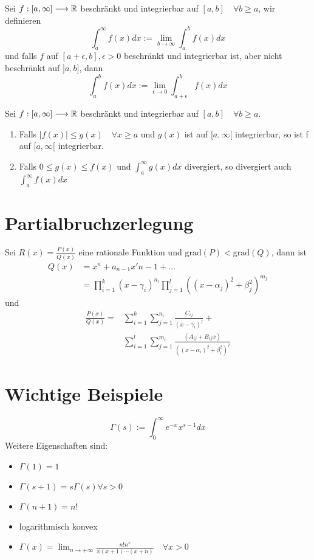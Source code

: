 \Def Sei $f:[a,\infty] \longrightarrow \mathbb{R}$ beschränkt und integrierbar auf $[a,b] \quad \forall b \geq a$, wir definieren
$$\int_a^\infty f(x) dx := \lim_{b \rightarrow \infty} \int_a^b f(x) dx$$
und falls $f$ auf $[a+\epsilon,b], \epsilon>0$ beschränkt und integrierbar ist, aber nicht beschränkt auf $]a,b]$, dann
$$\int_a^b f(x) dx := \lim_{\epsilon \rightarrow 0} \int_{a+\epsilon}^b f(x) dx$$

\Lemma Sei $f:[a,\infty] \longrightarrow \mathbb{R}$ beschränkt und integrierbar auf $[a,b] \quad \forall b \geq a$.
\begin{enumerate}
  \item Falls $|f(x)| \leqslant g(x) \quad \forall x \geqslant a$ und $g(x)$ ist auf $[a, \infty[$ integrierbar, so ist f auf $[a, \infty[$ integrierbar.
  \item Falls $0 \leqslant g(x) \leqslant f(x)$ und $\int_a^\infty g(x) dx$ divergiert, so divergiert auch $\int_a^\infty f(x) dx$
\end{enumerate}

\section{Partialbruchzerlegung}
\Trick Sei $R(x) = \frac{P(x)}{Q(x)}$ eine rationale Funktion und $\text{grad}(P) < \text{grad}(Q)$, dann ist
\begin{align*}
Q(x) &= x^n + a_{n-1}x'{n-1}+\dots \\
	 &=	\prod_{i=1}^{k}\left(x-\gamma_{i}\right)^{n_{i}} \prod_{j=1}^{l}\left(\left(x-\alpha_{j}\right)^{2}+\beta_{j}^{2}\right)^{m_{j}} 
\end{align*}
und
\begin{align*}
\frac{P(x)}{Q(x)}=&\sum_{i=1}^{k} \sum_{j=1}^{n_{i}} \frac{C_{i j}}{\left(x-\gamma_{i}\right)^{j}}+ \\
				 &\sum_{i=1}^{l} \sum_{j=1}^{m_{i}} \frac{\left(A_{i j}+B_{i j} x\right)}{\left(\left(x-\alpha_{i}\right)^{2}+\beta_{i}^{2}\right)^{j}}
\end{align*}

\section{Wichtige Beispiele}
$$
\Gamma(s):=\int_{0}^{\infty} e^{-x} x^{s-1} d x
$$
Weitere Eigenschaften sind:
\begin{itemize}
	\item $\Gamma(1) = 1$
	\item $\Gamma(s+1) = s \Gamma(s) \forall s>0$
	\item $\Gamma(n+1) = n!$
	\item logarithmisch konvex
	\item $\Gamma(x)=\lim _{n \rightarrow+\infty} \frac{n ! n^{x}}{x(x+1) \cdots(x+n)} \quad \forall x>0$
\end{itemize}
